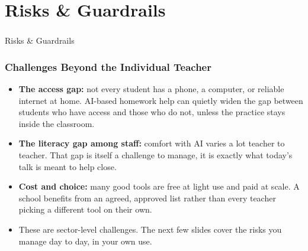 
\section[Risks]{Risks \& Guardrails}

\begin{frame}[fragile]\frametitle{}
\begin{center}
{\Large Risks \& Guardrails}
\end{center}
\end{frame}

\begin{frame}[fragile]\frametitle{Challenges Beyond the Individual Teacher}
\begin{itemize}
\item \textbf{The access gap:} not every student has a phone, a computer, or reliable internet at home. AI-based homework help can quietly widen the gap between students who have access and those who do not, unless the practice stays inside the classroom.
\item \textbf{The literacy gap among staff:} comfort with AI varies a lot teacher to teacher. That gap is itself a challenge to manage, it is exactly what today's talk is meant to help close.
\item \textbf{Cost and choice:} many good tools are free at light use and paid at scale. A school benefits from an agreed, approved list rather than every teacher picking a different tool on their own.
\item These are sector-level challenges. The next few slides cover the risks you manage day to day, in your own use.
\end{itemize}
\end{frame}

